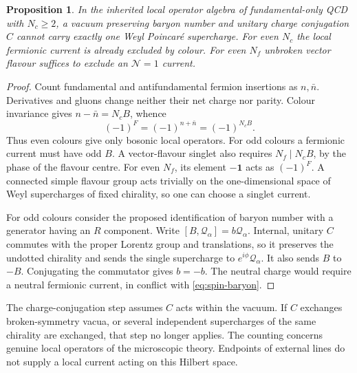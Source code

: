 \documentclass[11pt,a4paper]{article}
\theoremstyle{plain}
\newtheorem{proposition}[theorem]{Proposition}
\theoremstyle{definition}
\theoremstyle{remark}
\newcommand{\Nc}{N_{\!c}}
\newcommand{\Nf}{N_{\!f}}
\begin{document}
\begin{proposition}
In the inherited local operator algebra of fundamental-only QCD
with $\Nc\geq2$, a vacuum preserving baryon number and unitary charge
conjugation $C$ cannot carry exactly one Weyl Poincar\'e supercharge.
For even $\Nc$ the local fermionic current is already excluded by
colour. For even $\Nf$ unbroken vector flavour suffices to exclude
an $\mathcal N=1$ current.
\end{proposition}
\begin{proof}
Count fundamental and antifundamental fermion insertions as $n,\bar n$.
Derivatives and gluons change neither their net charge nor parity.
Colour invariance gives $n-\bar n=\Nc B$, whence
\begin{equation}\label{eq:spin-baryon}
 (-1)^F=(-1)^{n+\bar n}=(-1)^{\Nc B}.
\end{equation}
Thus even colours give only bosonic local operators. For odd colours
a fermionic current must have odd $B$. A vector-flavour singlet also
requires $\Nf\mid\Nc B$, by the phase of the flavour centre. For even
$\Nf$, its element $-\mathbf1$ acts as $(-1)^F$. A connected simple
flavour group acts trivially on the one-dimensional space of Weyl
supercharges of fixed chirality, so one can choose a singlet current.

For odd colours consider the proposed identification of baryon number
with a generator having an $R$ component. Write
$[B,\mathcal Q_\alpha]=b\mathcal Q_\alpha$. Internal, unitary $C$
commutes with the proper Lorentz group and translations, so it
preserves the undotted chirality and sends the single supercharge to
$e^{i\phi}\mathcal Q_\alpha$. It also sends $B$ to $-B$.
Conjugating the commutator gives $b=-b$. The neutral charge would
require a neutral fermionic current, in conflict with
\cref{eq:spin-baryon}.
\end{proof}

The charge-conjugation step assumes $C$ acts within the vacuum.
If $C$ exchanges broken-symmetry vacua, or several independent
supercharges of the same chirality are exchanged, that step no
longer applies. The counting concerns genuine local operators of
the microscopic theory. Endpoints of external lines do not supply
a local current acting on this Hilbert space.
\end{document}
